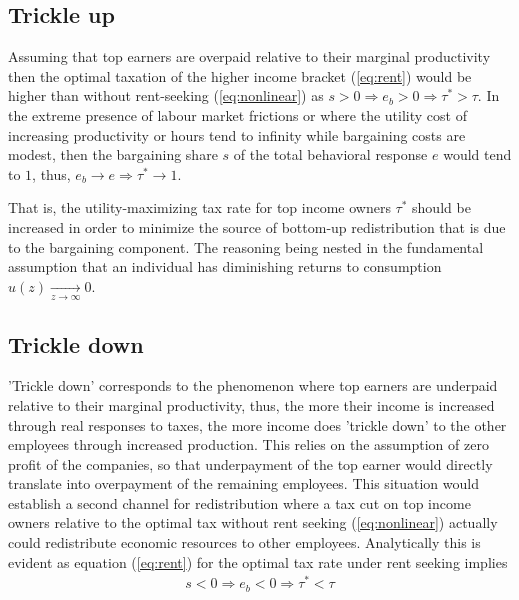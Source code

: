 \subsection{Trickle up}
Assuming that top earners are overpaid relative to their marginal productivity then the optimal taxation of the higher income bracket (\ref{eq:rent}) would be higher than without rent-seeking (\ref{eq:nonlinear}) as $s>0 \Rightarrow e_b>0 \Rightarrow \tau^{*}>\tau$. In the extreme presence of labour market frictions or where the utility cost of increasing productivity or hours tend to infinity while bargaining costs are modest, then the bargaining share $s$ of the total behavioral response $e$ would tend to $1$, thus, $e_b\rightarrow e \Rightarrow \tau^{*} \rightarrow 1$.\par
That is, the utility-maximizing tax rate for top income owners $\tau^{*}$ should be increased in order to minimize the source of bottom-up redistribution that is due to the bargaining component. The reasoning being nested in the fundamental assumption that an individual has diminishing returns to consumption $u(z)\xrightarrow[z\rightarrow\infty]{}0$.

\subsection{Trickle down}
'Trickle down' corresponds to the phenomenon where top earners are underpaid relative to their marginal productivity, thus, the more their income is increased through real responses to taxes, the more income does 'trickle down' to the other employees through increased production. This relies on the assumption of zero profit of the companies, so that underpayment of the top earner would directly translate into overpayment of the remaining employees. This situation would establish a second channel for redistribution where a tax cut on top income owners relative to the optimal tax without rent seeking (\ref{eq:nonlinear}) actually could redistribute economic resources to other employees. Analytically this is evident as equation (\ref{eq:rent}) for the optimal tax rate under rent seeking implies
\begin{align*}
  s<0\Rightarrow e_b<0 \Rightarrow \tau^{*}<\tau
\end{align*}
